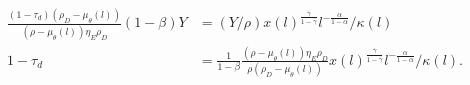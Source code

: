 \documentclass[11pt]{article}
\theoremstyle{plain}
\begin{document}
\begin{align*}
\frac{(1-\tau_d)(\rho_D - \mu_{\theta}(l))}{(\rho - \mu_{\theta}(l))\eta_E \rho_D}(1-\beta)Y & = (Y/\rho) x(l)^{\frac{\overline{\gamma}}{1-\overline{\gamma}}}l^{-\frac{\alpha}{1-\alpha}}/\kappa(l)
\\ 1-\tau_d & = \frac{1}{1-\beta} \frac{(\rho - \mu_{\theta}(l))\eta_E \rho_D}{\rho (\rho_D - \mu_{\theta}(l))} x(l)^{\frac{\overline{\gamma}}{1-\overline{\gamma}}}l^{-\frac{\alpha}{1-\alpha}}/\kappa(l).
\end{align*}

\end{document}
